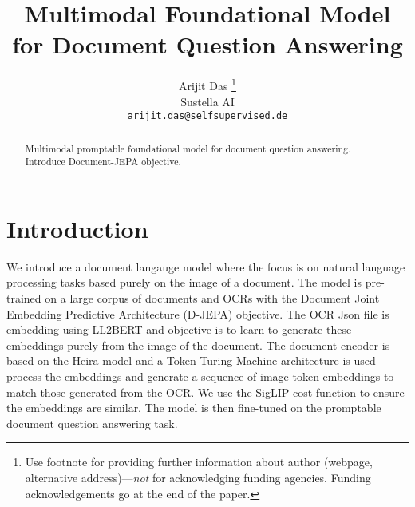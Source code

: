 \documentclass{article} %
\title{Multimodal Foundational Model for Document Question Answering}
\author{Arijit Das \thanks{ Use footnote for providing further information
about author (webpage, alternative address)---\emph{not} for acknowledging
funding agencies.  Funding acknowledgements go at the end of the paper.} \\
Sustella AI\\
\texttt{arijit.das@selfsupervised.de}
}
\begin{document}
\maketitle

\begin{abstract}
Multimodal promptable foundational model for document question answering. Introduce Document-JEPA objective. 
\end{abstract}

\section{Introduction}

We introduce a document langauge model where the focus is on natural language processing tasks based purely on the image of a document. The model is pre-trained on a large corpus of documents and OCRs with the Document Joint Embedding Predictive Architecture (D-JEPA) objective. The OCR Json file is embedding using LL2BERT and objective is to learn to generate these embeddings purely from the image of the document. The document encoder is based on the Heira model and a Token Turing Machine architecture is used process the embeddings and generate a sequence of image token embeddings to match those generated from the OCR. We use the SigLIP cost function to ensure the embeddings are similar. The model is then fine-tuned on the promptable document question answering task.

\end{document}
